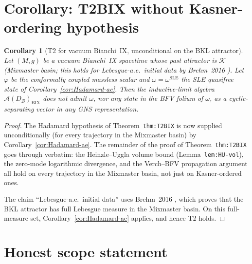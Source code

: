 \documentclass[11pt]{article}
\newtheorem{corollary}[lemma]{Corollary}
\theoremstyle{definition}
\newcommand{\BIX}{\mathrm{BIX}}
\newcommand{\KK}{\mathcal{K}}
\begin{document}
\section{Corollary: T2BIX without Kasner-ordering hypothesis}

\begin{corollary}[T2 for vacuum Bianchi~IX, unconditional on the BKL attractor]
  \label{cor:T2BIX-unconditional}
  Let $(M,g)$ be a vacuum Bianchi~IX spacetime whose past attractor is $\KK$
  (Mixmaster basin; this holds for Lebesgue-a.e.\ initial data by Brehm~2016
  \cite{Brehm2016}).  Let $\varphi$ be the conformally coupled massless scalar
  and $\omega = \omega^{\mathrm{SLE}}$ the SLE quasifree state of
  Corollary~\ref{cor:Hadamard-ae}.  Then the inductive-limit algebra
  $\mathcal{A}(D_{\mathcal{B}})_{\BIX}$ does not admit $\omega$, nor any state in
  the BFV folium of $\omega$, as a cyclic-separating vector in any GNS
  representation.
\end{corollary}

\begin{proof}
  The Hadamard hypothesis of Theorem~\texttt{thm:T2BIX} is now supplied
  unconditionally (for every trajectory in the Mixmaster basin) by
  Corollary~\ref{cor:Hadamard-ae}.  The remainder of the proof of
  Theorem~\texttt{thm:T2BIX} goes through verbatim: the Heinzle--Uggla
  volume bound (Lemma~\texttt{lem:HU-vol}), the zero-mode logarithmic
  divergence, and the Verch--BFV propagation argument all hold on every
  trajectory in the Mixmaster basin, not just on Kasner-ordered ones.

  The claim ``Lebesgue-a.e.\ initial data'' uses Brehm~2016 \cite{Brehm2016},
  which proves that the BKL attractor has full Lebesgue measure in the
  Mixmaster basin.  On this full-measure set, Corollary~\ref{cor:Hadamard-ae}
  applies, and hence T2 holds.
\end{proof}

\section{Honest scope statement}
\end{document}
